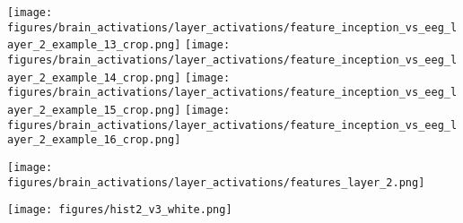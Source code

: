 \documentclass[10pt,journal,compsoc,twocolumn]{IEEEtran}
\begin{document}
\begin{figure*}
{\begin{minipage}{.20\textwidth}
  \texttt{[image: figures/brain\_activations/layer\_activations/feature\_inception\_vs\_eeg\_layer\_2\_example\_13\_crop.png]}
  \texttt{[image: figures/brain\_activations/layer\_activations/feature\_inception\_vs\_eeg\_layer\_2\_example\_14\_crop.png]}
  \texttt{[image: figures/brain\_activations/layer\_activations/feature\_inception\_vs\_eeg\_layer\_2\_example\_15\_crop.png]}
  \texttt{[image: figures/brain\_activations/layer\_activations/feature\_inception\_vs\_eeg\_layer\_2\_example\_16\_crop.png]}
 \end{minipage}\hspace{0.5cm}
 \begin{minipage}{.20\textwidth}
  \centering
  \texttt{[image: figures/brain\_activations/layer\_activations/features\_layer\_2.png]}
 \end{minipage}\hspace{0.5cm}
  \begin{minipage}{.40\textwidth}
  \centering
   \texttt{[image: figures/hist2\_v3\_white.png]}
 \end{minipage}

}


\end{figure*}
\end{document}

